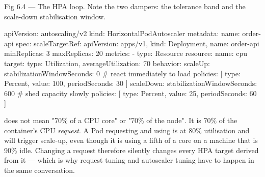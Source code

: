 \begin{wbfigure}{Fig 6.4 — The HPA loop. Note the two dampers: the tolerance band and the scale-down stabilisation window.}
\end{wbfigure}

\begin{k8sbox}
apiVersion: autoscaling/v2
kind: HorizontalPodAutoscaler
metadata: { name: order-api }
spec:
  scaleTargetRef: { apiVersion: apps/v1, kind: Deployment, name: order-api }
  minReplicas: 3
  maxReplicas: 20
  metrics:
    - type: Resource
      resource:
        name: cpu
        target: { type: Utilization, averageUtilization: 70 }
  behavior:
    scaleUp:
      stabilizationWindowSeconds: 0     # react immediately to load
      policies: [{ type: Percent, value: 100, periodSeconds: 30 }]
    scaleDown:
      stabilizationWindowSeconds: 600   # shed capacity slowly
      policies: [{ type: Percent, value: 25, periodSeconds: 60 }]
\end{k8sbox}

\begin{misconception}
 does not mean "70\% of a CPU core" or "70\% of the node". It is 70\% of the container's CPU \emph{request}. A Pod requesting  and using  is at 80\% utilisation and will trigger scale-up, even though it is using a fifth of a core on a machine that is 90\% idle. Changing a request therefore silently changes every HPA target derived from it --- which is why request tuning and autoscaler tuning have to happen in the same conversation.
\end{misconception}

